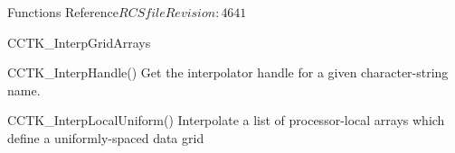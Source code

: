 \begin{cactuspart}{ Functions Reference}{$RCSfile$}{$Revision: 4641 $}
\begin{FunctionDescription}{CCTK\_InterpGridArrays}
\begin{SeeAlsoSection}
\begin{SeeAlso}{CCTK\_InterpHandle()}
Get the interpolator handle for a given character-string name.
\end{SeeAlso}
\begin{SeeAlso}{CCTK\_InterpLocalUniform()}
Interpolate a list of processor-local arrays
which define a uniformly-spaced data grid
\end{SeeAlso}
\end{SeeAlsoSection}


\end{FunctionDescription}
\end{cactuspart}
